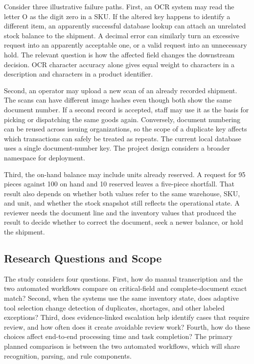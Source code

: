 \documentclass[conference]{IEEEtran}
\begin{document}
Consider three illustrative failure paths. First, an OCR system may read the letter O as the digit zero in a SKU. If the altered key happens to identify a different item, an apparently successful database lookup can attach an unrelated stock balance to the shipment. A decimal error can similarly turn an excessive request into an apparently acceptable one, or a valid request into an unnecessary hold. The relevant question is how the affected field changes the downstream decision. OCR character accuracy alone gives equal weight to characters in a description and characters in a product identifier.

Second, an operator may upload a new scan of an already recorded shipment. The scans can have different image hashes even though both show the same document number. If a second record is accepted, staff may use it as the basis for picking or dispatching the same goods again. Conversely, document numbering can be reused across issuing organizations, so the scope of a duplicate key affects which transactions can safely be treated as repeats. The current local database uses a single document-number key. The project design considers a broader namespace for deployment.

Third, the on-hand balance may include units already reserved. A request for 95 pieces against 100 on hand and 10 reserved leaves a five-piece shortfall. That result also depends on whether both values refer to the same warehouse, SKU, and unit, and whether the stock snapshot still reflects the operational state. A reviewer needs the document line and the inventory values that produced the result to decide whether to correct the document, seek a newer balance, or hold the shipment.

\subsection{Research Questions and Scope}
The study considers four questions. First, how do manual transcription and the two automated workflows compare on critical-field and complete-document exact match? Second, when the systems use the same inventory state, does adaptive tool selection change detection of duplicates, shortages, and other labeled exceptions? Third, does evidence-linked escalation help identify cases that require review, and how often does it create avoidable review work? Fourth, how do these choices affect end-to-end processing time and task completion? The primary planned comparison is between the two automated workflows, which will share recognition, parsing, and rule components.
\end{document}

